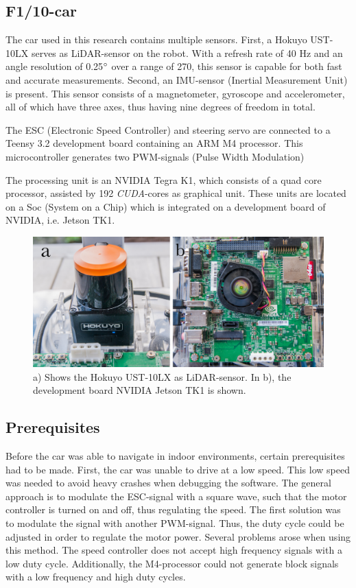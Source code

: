 \documentclass[conference,a4paper]{IEEEtran}
\begin{document}
\subsection{F1/10-car}
The car used in this research contains multiple sensors. First, a Hokuyo UST-10LX serves as LiDAR-sensor on the robot. With a refresh rate of 40 Hz and an angle resolution of 0.25$\degree$ over a range of 270\degree, this sensor is capable for both fast and accurate measurements. Second, an IMU-sensor (Inertial Measurement Unit) is present. This sensor consists of a magnetometer, gyroscope and accelerometer, all of which have three axes, thus having nine degrees of freedom in total.

The ESC (Electronic Speed Controller) and steering servo are connected to a Teensy 3.2 development board containing an ARM M4 processor. This microcontroller generates two PWM-signals (Pulse Width Modulation) 

The processing unit is an NVIDIA Tegra K1, which consists of a quad core processor, assisted by 192 \emph{CUDA}-cores as graphical unit. These units are located on a Soc (System on a Chip) which is integrated on a development board of NVIDIA, i.e. Jetson TK1.

\begin{figure}[!t]
	\includegraphics[width=\columnwidth]{f1_lidar_tk1}
	\centering
	\caption{a) Shows the Hokuyo UST-10LX as LiDAR-sensor. In b), the development board NVIDIA Jetson TK1 is shown.}
	\label{fig:f1_lidar_tk1}
\end{figure}

\subsection{Prerequisites}
Before the car was able to navigate in indoor environments, certain prerequisites had to be made. First, the car was unable to drive at a low speed. This low speed was needed to avoid heavy crashes when debugging the software. The general approach is to modulate the ESC-signal with a square wave, such that the motor controller is turned on and off, thus regulating the speed. The first solution was to modulate the signal with another PWM-signal. Thus, the duty cycle could be adjusted in order to regulate the motor power. Several problems arose when using this method. The speed controller does not accept high frequency signals with a low duty cycle. Additionally, the M4-processor could not generate block signals with a low frequency and high duty cycles.
\end{document}
